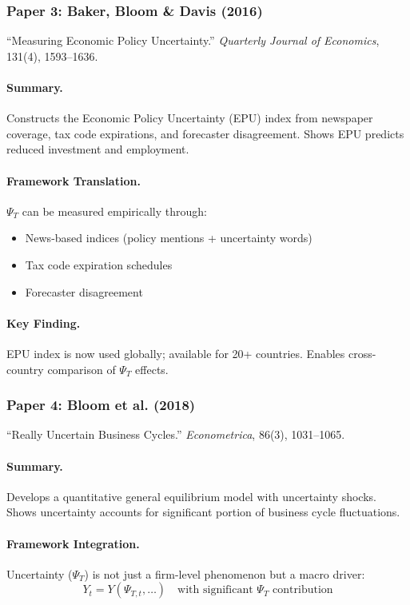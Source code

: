 \documentclass[12pt,a4paper]{article}
\begin{document}
\subsubsection{Paper 3: Baker, Bloom \& Davis (2016)}

``Measuring Economic Policy Uncertainty.''
\textit{Quarterly Journal of Economics}, 131(4), 1593--1636.

\paragraph{Summary.}
Constructs the Economic Policy Uncertainty (EPU) index from newspaper coverage,
tax code expirations, and forecaster disagreement. Shows EPU predicts reduced
investment and employment.

\paragraph{Framework Translation.}
$\Psi_T$ can be measured empirically through:
\begin{itemize}
  \item News-based indices (policy mentions + uncertainty words)
  \item Tax code expiration schedules
  \item Forecaster disagreement
\end{itemize}

\paragraph{Key Finding.}
EPU index is now used globally; available for 20+ countries. Enables cross-country
comparison of $\Psi_T$ effects.

\subsubsection{Paper 4: Bloom et al. (2018)}

``Really Uncertain Business Cycles.''
\textit{Econometrica}, 86(3), 1031--1065.

\paragraph{Summary.}
Develops a quantitative general equilibrium model with uncertainty shocks.
Shows uncertainty accounts for significant portion of business cycle fluctuations.

\paragraph{Framework Integration.}
Uncertainty ($\Psi_T$) is not just a firm-level phenomenon but a macro driver:
\begin{equation}
  Y_t = Y(\Psi_{T,t}, \ldots) \quad \text{with significant } \Psi_T \text{ contribution}
\end{equation}
\end{document}
